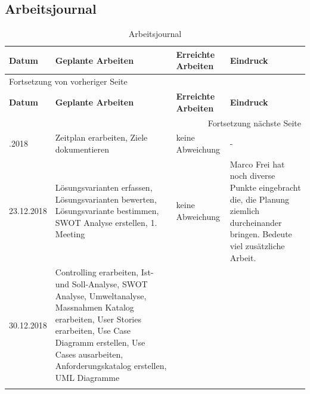 \newpage
\begin{landscape}
\section{Arbeitsjournal}
\label{sec:org60aa9ed}

\begin{longtable}{|p{2cm}|p{5cm}|p{5cm}|p{7cm}|}
\hline
\textbf{Datum}\cellcolor[HTML]{C0C0C0} & \textbf{Geplante Arbeiten}\cellcolor[HTML]{C0C0C0} & \textbf{Erreichte Arbeiten}\cellcolor[HTML]{C0C0C0} & \textbf{Eindruck}\cellcolor[HTML]{C0C0C0}\\
\hline
\endfirsthead
\multicolumn{4}{l}{Fortsetzung von vorheriger Seite} \\
\hline

\textbf{Datum}\cellcolor[HTML]{C0C0C0} & \textbf{Geplante Arbeiten}\cellcolor[HTML]{C0C0C0} & \textbf{Erreichte Arbeiten}\cellcolor[HTML]{C0C0C0} & \textbf{Eindruck}\cellcolor[HTML]{C0C0C0} \\

\hline
\endhead
\hline\multicolumn{4}{r}{Fortsetzung nächste Seite} \\
\endfoot
\endlastfoot
\hline
16.12.2018 & Zeitplan erarbeiten, Ziele dokumentieren & keine Abweichung & -\\
\hline
23.12.2018 & Lösungsvarianten erfassen, Lösungsvarianten bewerten, Lösungsvariante bestimmen, SWOT Analyse erstellen, 1. Meeting & keine Abweichung & Marco Frei hat noch diverse Punkte eingebracht die, die Planung ziemlich durcheinander bringen. Bedeute viel zusätzliche Arbeit.\\
\hline
30.12.2018 & Controlling erarbeiten, Ist- und Soll-Analyse, SWOT Analyse, Umweltanalyse, Massnahmen Katalog erarbeiten, User Stories erarbeiten, Use Case Diagramm erstellen, Use Cases ausarbeiten, Anforderungskatalog erstellen, UML Diagramme &  & \\
\hline
\caption{\label{tab:orgbb31bb1}
Arbeitsjournal}
\\
\end{longtable}
\end{landscape}

